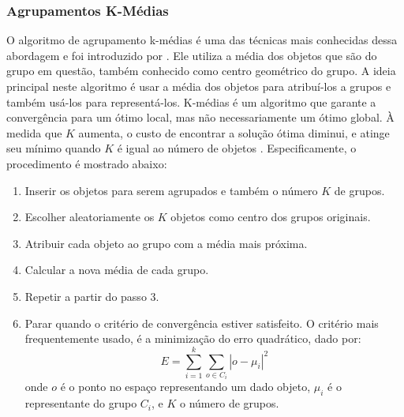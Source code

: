 \subsubsection{Agrupamentos K-Médias}
O algoritmo de agrupamento k-médias é uma das técnicas mais conhecidas dessa abordagem e foi introduzido por \cite{Macqueen67}. Ele utiliza a média dos objetos que são do grupo em questão, também conhecido como centro geométrico do grupo. A ideia principal neste algoritmo é usar a média dos objetos para atribuí-los a grupos e também usá-los para  representá-los.
K-médias é um algoritmo que garante a convergência para um ótimo local, mas não necessariamente um ótimo global. À medida que ${K}$ aumenta, o custo de encontrar a solução ótima diminui, e atinge seu mínimo quando ${K}$ é igual ao número de objetos \cite{Wu2008}. Especificamente, o procedimento é mostrado abaixo:
 \begin{enumerate}
	\item Inserir os objetos para serem agrupados e também o número ${K}$ de grupos.
	\item Escolher aleatoriamente os ${K}$ objetos como centro dos grupos originais.
	\item Atribuir cada objeto ao grupo com a média mais próxima.
	\item Calcular a nova média de cada grupo.
	\item Repetir a partir do passo 3.
	\item Parar quando o critério de convergência estiver satisfeito. O critério mais frequentemente usado, é a minimização do erro quadrático, dado por: 
	\begin{equation}
	E = \sum_{i=1}^{k}\sum_{o\in C_{i}} |o - \mu_{i}|^{2}
	\end{equation}
	onde ${o}$ é o ponto no espaço representando um dado objeto, ${\mu_{i}}$ é o representante do grupo ${C_{i}}$,
	 e ${K}$ o número de grupos.
\end{enumerate}

